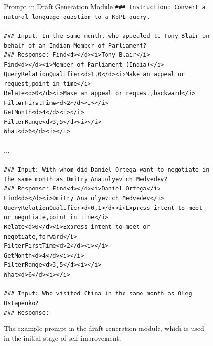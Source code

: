 \documentclass[10pt, a4paper]{article}
\begin{document}
\begin{figure}
    \begin{mybox}{Prompt in Draft Generation Module}
\texttt{\#\#\# Instruction: Convert a natural language question to a KoPL query.} \\ \\
        \texttt{\#\#\# Input: In the same month, who appealed to Tony Blair on behalf of an Indian Member of Parliament?} \\
        \texttt{\#\#\# Response: Find<d></d><i>Tony Blair</i>}\\
        \texttt{Find<d></d><i>Member of Parliament (India)</i>}\\
        \texttt{QueryRelationQualifier<d>1,0</d><i>Make an appeal or request,point in time</i>}\\
        \texttt{Relate<d>0</d><i>Make an appeal or request,backward</i>}\\
        \texttt{FilterFirstTime<d>2</d><i></i>}\\
        \texttt{GetMonth<d>4</d><i></i>}\\
        \texttt{FilterRange<d>3,5</d><i></i>}\\
        \texttt{What<d>6</d><i></i>}\\ \\
        ...\\ \\
        \texttt{\#\#\# Input: With whom did Daniel Ortega want to negotiate in the same month as Dmitry Anatolyevich Medvedev?} \\
        \texttt{\#\#\# Response: Find<d></d><i>Daniel Ortega</i>}\\
        \texttt{Find<d></d><i>Dmitry Anatolyevich Medvedev</i>}\\
        \texttt{QueryRelationQualifier<d>0,1</d><i>Express intent to meet or negotiate,point in time</i>}\\
        \texttt{Relate<d>0</d><i>Express intent to meet or negotiate,forward</i>}\\
        \texttt{FilterFirstTime<d>2</d><i></i>}\\
        \texttt{GetMonth<d>4</d><i></i>}\\
        \texttt{FilterRange<d>3,5</d><i></i>}\\
        \texttt{What<d>6</d><i></i>}\\ \\
        \texttt{\#\#\# Input: Who visited China in the same month as Oleg Ostapenko?} \\
        \texttt{\#\#\# Response:} \\
\end{mybox}
\caption{The example prompt in the draft generation module, which is used in the initial stage of self-improvement.}
\label{table:draft}
\end{figure}
\end{document}
